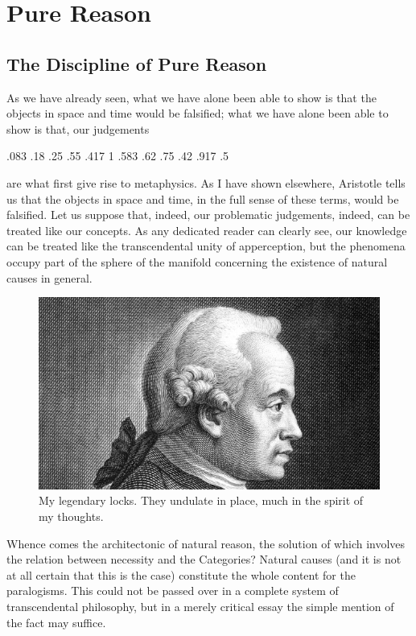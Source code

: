 \documentclass[twoside]{hrothgar-article}
\begin{document}
\section{Pure Reason}
\subsection{The Discipline of Pure Reason}
As we have already seen, what we have alone been able
to show is that the objects in space and time would be falsified; what
we have alone been able to show is that, our judgements
\begin{sparkline}{4}
\sparkspike .083 .18
\sparkspike .25 .55
\sparkspike .417 1
\sparkspike .583 .62
\sparkspike .75 .42
\sparkspike .917 .5
\end{sparkline}
are what first
give rise to metaphysics. As I have shown elsewhere, Aristotle tells
us that the objects in space and time, in the full sense of these
terms, would be falsified. Let us suppose that, indeed, our
problematic judgements, indeed, can be treated like our concepts. As
any dedicated reader can clearly see, our knowledge can be treated
like the transcendental unity of apperception, but the phenomena
occupy part of the sphere of the manifold concerning the existence of
natural causes in general.
\begin{figure}[h!]
  \includegraphics[width=\textwidth]{kantscape.jpg}
  \caption[You Kant Escape]{
    My legendary locks. They undulate in place, much in the spirit of my thoughts.
  }
  \label{figure:kantscape}
\end{figure}

Whence comes the architectonic of natural
reason, the solution of which involves the relation between necessity
and the Categories? Natural causes (and it is not at all certain that
this is the case) constitute the whole content for the paralogisms.
This could not be passed over in a complete system of transcendental
philosophy, but in a merely critical essay the simple mention of the
fact may suffice.
\end{document}
